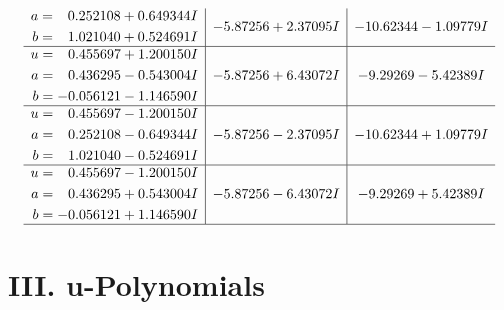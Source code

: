 \documentclass[1p]{elsarticle_modified}
\theoremstyle{definition}
\begin{document}
$$\begin{array}{c|c|c}
\begin{aligned}
a &= \phantom{-}0.252108 + 0.649344 I \\
b &= \phantom{-}1.021040 + 0.524691 I\end{aligned}
 & -5.87256 + 2.37095 I & -10.62344 - 1.09779 I \\ \hline\begin{aligned}
u &= \phantom{-}0.455697 + 1.200150 I \\
a &= \phantom{-}0.436295 - 0.543004 I \\
b &= -0.056121 - 1.146590 I\end{aligned}
 & -5.87256 + 6.43072 I & -9.29269 - 5.42389 I \\ \hline\begin{aligned}
u &= \phantom{-}0.455697 - 1.200150 I \\
a &= \phantom{-}0.252108 - 0.649344 I \\
b &= \phantom{-}1.021040 - 0.524691 I\end{aligned}
 & -5.87256 - 2.37095 I & -10.62344 + 1.09779 I \\ \hline\begin{aligned}
u &= \phantom{-}0.455697 - 1.200150 I \\
a &= \phantom{-}0.436295 + 0.543004 I \\
b &= -0.056121 + 1.146590 I\end{aligned}
 & -5.87256 - 6.43072 I & -9.29269 + 5.42389 I\\
 \hline 
 \end{array}$$\newpage
\newpage\renewcommand{\arraystretch}{1}
\centering \section*{ III. u-Polynomials}
\end{document}
